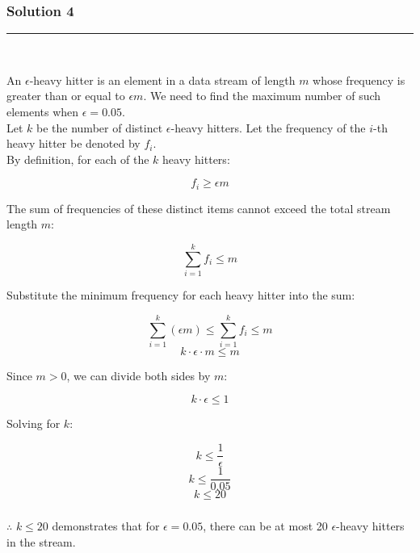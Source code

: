 \documentclass{article}
\begin{document}
\subsubsection*{Solution 4}
\noindent\rule{\textwidth}{0.4pt}\\

\begin{flushleft}
An $\epsilon$-heavy hitter is an element in a data stream of length $m$ whose frequency is greater than or equal to $\epsilon m$. We need to find the maximum number of such elements when $\epsilon = 0.05$.
\\

Let $k$ be the number of distinct $\epsilon$-heavy hitters. Let the frequency of the $i$-th heavy hitter be denoted by $f_i$.
\\

By definition, for each of the $k$ heavy hitters:
\end{flushleft}

\[ f_i \geq \epsilon m \]
\begin{flushleft}
  The sum of frequencies of these distinct items cannot exceed the total stream length $m$:
\end{flushleft}

\[ \sum_{i=1}^{k} f_i \leq m \]

\begin{flushleft}
Substitute the minimum frequency for each heavy hitter into the sum:  
\end{flushleft}

\[ \sum_{i=1}^{k} (\epsilon m) \leq \sum_{i=1}^{k} f_i \leq m \]
\[ k \cdot \epsilon \cdot m \leq m \]

\begin{flushleft}
Since $m > 0$, we can divide both sides by $m$:  
\end{flushleft}

\[ k \cdot \epsilon \leq 1 \]

\begin{flushleft}
Solving for $k$:
\end{flushleft}

\[ k \leq \frac{1}{\epsilon} \]
\[ k \leq \frac{1}{0.05} \]
\[ k \leq 20 \]  


\subsubsection*{\normalfont}{$\therefore$ $k \leq 20$ demonstrates that for $\epsilon=0.05$, there can be at most 20 $\epsilon$-heavy hitters in the stream.}
\end{document}
